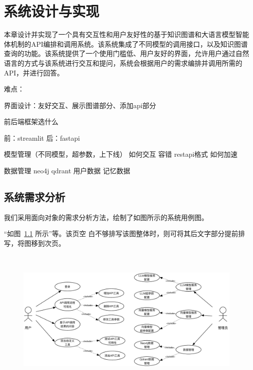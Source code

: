 
\chapter{系统设计与实现}

本章设计并实现了一个具有交互性和用户友好性的基于知识图谱和大语言模型智能体机制的API编排和调用系统。该系统集成了不同模型的调用接口，以及知识图谱查询的功能。该系统提供了一个使用门槛低、用户友好的界面，允许用户通过自然语言的方式与该系统进行交互和提问，系统会根据用户的需求编排并调用所需的API，并进行回答。

难点：

界面设计：友好交互、展示图谱部分、添加api部分

前后端框架选什么

前：streamlit 后：fastapi


模型管理（不同模型，超参数，上下线） 如何交互 容错 restapi格式 如何加速

数据管理 neo4j qdrant 用户数据 记忆数据

\section{系统需求分析}

\indent 我们采用面向对象的需求分析方法，绘制了如图所示的系统用例图。

“如图~\ref{fig:usecase} 所示”等。该页空
白不够排写该图整体时，则可将其后文字部分提前排写，将图移到次页。

\begin{figure}[!htp]
  \vspace{1em}
  \centering
  \setlength{\abovecaptionskip}{10pt} %
  \includegraphics[height=7cm]{../assets/ch5-用例图.pdf}
  \label{fig:usecase}
\end{figure}

